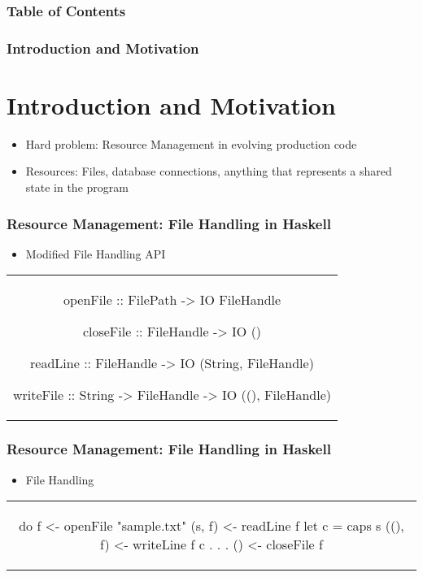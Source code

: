 \documentclass[xcolor={dvipsnames}, frame]{beamer}
\title{\qub{}}
\subtitle{A Resource Aware Functional Programming Language}
\author{Apoorv Ingle}
\date{}
\institute[KU]{The University of Kansas}
\begin{document}
\frame\titlepage

\begin{frame}
  \frametitle{Table of Contents}
  \tableofcontents
\end{frame}


\begin{frame}
\frametitle{Introduction and Motivation}
\section{Introduction and Motivation}\label{sec:introduction}

\begin{itemize}
\item Hard problem: Resource Management in evolving production code
\item Resources: Files, database connections, anything that represents a shared state in the program
\end{itemize}
\end{frame}

\begin{frame}[fragile]
  \frametitle{Resource Management: File Handling in Haskell}
  \begin{center}
    \begin{itemize}
    \item Modified File Handling API
    \end{itemize}
    \begin{tabular}[h]{c}
      \begin{haskell}
     openFile  :: FilePath   -> IO FileHandle

     closeFile :: FileHandle -> IO ()

     readLine  :: FileHandle -> IO (String, FileHandle)

     writeFile :: String     -> FileHandle
                             -> IO ((), FileHandle)
      \end{haskell}
    \end{tabular}
\end{center}

\end{frame}

\begin{frame}[fragile]
  \frametitle{Resource Management: File Handling in Haskell}
  \begin{center}
    \begin{itemize}
    \item File Handling
    \end{itemize}
    \begin{tabular}[h]{c}
      \begin{haskell}
        do f  <- openFile "sample.txt"
           (s, f)  <- readLine f
           let c = caps s
           ((), f) <- writeLine f c
                  .
                  .
                  .
           () <- closeFile f
      \end{haskell}
    \end{tabular}
  \end{center}
\end{frame}
\end{document}
